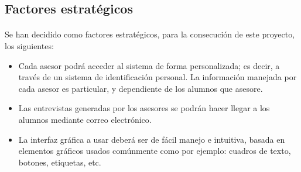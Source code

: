 \subsection{Factores estratégicos}

\paragraph{}Se han decidido como factores estratégicos, para la consecución de
este proyecto, los siguientes:

\begin{itemize}
   \item Cada asesor podrá acceder al sistema de forma personalizada; es decir,
   a través de un sistema de identificación personal. La información manejada
   por cada asesor es particular, y dependiente de los alumnos que asesore.
   \item Las entrevistas generadas por los asesores se podrán hacer llegar a los
   alumnos mediante correo electrónico.
   \item La interfaz gráfica a usar deberá ser de fácil manejo e intuitiva,
   basada en elementos gráficos usados comúnmente como por ejemplo: cuadros de
   texto, botones, etiquetas, etc.
\end{itemize}

